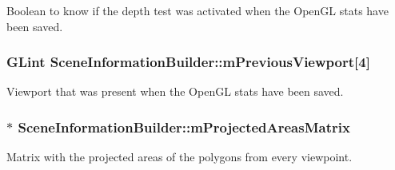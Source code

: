 Boolean to know if the depth test was activated when the Open\+G\+L stats have been saved. 

\hypertarget{class_scene_information_builder_a72b702fa23072e9b080442cf8b135528}{
\subsubsection[{m\+Previous\+Viewport}]{\setlength{\rightskip}{0pt plus 5cm}G\+Lint Scene\+Information\+Builder\+::m\+Previous\+Viewport\mbox{[}4\mbox{]}\hspace{0.3cm}{\ttfamily [protected]}}}\label{class_scene_information_builder_a72b702fa23072e9b080442cf8b135528}


Viewport that was present when the Open\+G\+L stats have been saved. 

\hypertarget{class_scene_information_builder_a49c32356448cd956fd79a708cbef0fc6}{
\subsubsection[{m\+Projected\+Areas\+Matrix}]{$\ast$ Scene\+Information\+Builder\+::m\+Projected\+Areas\+Matrix\hspace{0.3cm}{\ttfamily [protected]}}}\label{class_scene_information_builder_a49c32356448cd956fd79a708cbef0fc6}


Matrix with the projected areas of the polygons from every viewpoint. 

